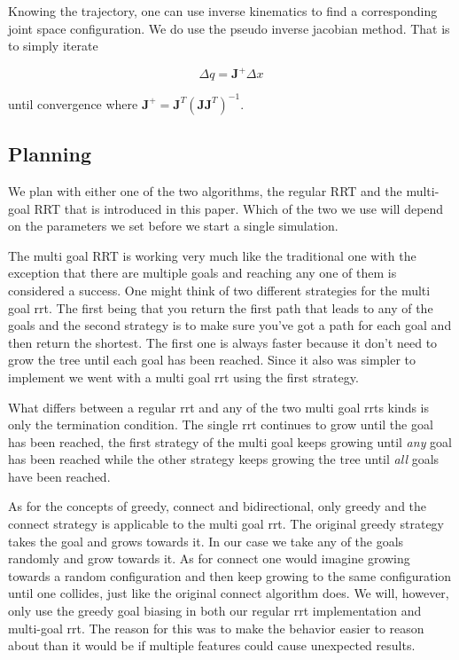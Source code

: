 \documentclass[letterpaper, 10 pt, conference]{ieeeconf}  %
\begin{document}
Knowing the trajectory, one can use inverse kinematics to find a corresponding
joint space configuration. We do use the pseudo inverse jacobian method.
That is to simply iterate

\[
  \Delta q = \mathbf{J}^{+} \Delta x
\]

until convergence where $\mathbf{J}^{+} =
\mathbf{J}^T(\mathbf{J}\mathbf{J}^T)^{-1}$.


\subsection{Planning}

We plan with either one of the two algorithms, the regular RRT
\cite{lavalle2001randomized} and the multi-goal RRT that is introduced in this
paper. Which of the two we use will depend on the parameters we set before we
start a single simulation.

The multi goal RRT is working very much like the traditional one with
the exception that there are multiple goals and reaching any one of them
is considered a success. One might think of two different strategies for
the multi goal rrt. The first being that you return the first path that
leads to any of the goals and the second strategy is to make sure you've
got a path for each goal and then return the shortest. The first one is
always faster because it don't need to grow the tree until each goal has
been reached. Since it also was simpler to implement we went with a
multi goal rrt using the first strategy.

What differs between a regular rrt and any of the two multi goal rrts
kinds is only the termination condition. The single rrt continues to
grow until the goal has been reached, the first strategy of the multi
goal keeps growing until \emph{any} goal has been reached while the
other strategy keeps growing the tree until \emph{all} goals have been
reached.

As for the concepts of greedy, connect and bidirectional, only greedy and the
connect strategy is applicable to the multi goal rrt. The original greedy
strategy takes the goal and grows towards it\cite{robocup, FergusonKS06}. In
our case we take any of the goals randomly and grow towards it. As for connect
one would imagine growing towards a random configuration and then keep growing
to the same configuration until one collides, just like the original connect
algorithm does\cite{kuffner2000rrt}. We will, however, only use the greedy goal
biasing in both our regular rrt implementation and multi-goal rrt. The reason
for this was to make the behavior easier to reason about than it would be if
multiple features could cause unexpected results.
\end{document}
